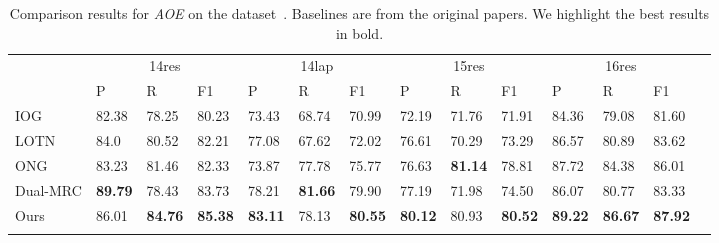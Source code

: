 \documentclass[11pt,a4paper]{article}
\begin{document}
\begin{table*}[ht]
  \centering\small
  \setlength{\tabcolsep}{0.75pt} \renewcommand{\arraystretch}{1.3}
  \begin{tabular}{m{2.5cm}m{1.065cm}<{\centering}m{1.065cm}<{\centering}m{1.065cm}<{\centering}|m{1.065cm}<{\centering}m{1.065cm}<{\centering}m{1.065cm}<{\centering}|m{1.065cm}<{\centering}m{1.065cm}<{\centering}m{1.065cm}<{\centering}|m{1.065cm}<{\centering}m{1.065cm}<{\centering}m{1.065cm}<{\centering}m{1.065cm}<{\centering}}
    \Xhline{0.08em}
    \multirow{2}{*}{Model} & \multicolumn{3}{c|}{14res} & \multicolumn{3}{c|}{14lap} & \multicolumn{3}{c|}{15res} & \multicolumn{3}{c}{16res} \\
    \cline{2-13}
    & P       & R      & F1     & P       & R      & F1     & P       & R      & F1     & P       & R      & F1     \\
    \cline{1-13}
    IOG                    & 82.38   & 78.25  & 80.23  & 73.43   & 68.74  & 70.99  & 72.19   & 71.76  & 71.91  & 84.36   & 79.08  & 81.60   \\
  LOTN                   & 84.0      & 80.52  & 82.21  & 77.08   & 67.62  & 72.02  & 76.61   & 70.29  & 73.29  & 86.57   & 80.89  & 83.62  \\
  ONG                    & 83.23   & 81.46  & 82.33  & 73.87   & 77.78  & 75.77  & 76.63   & \textbf{81.14}  & 78.81  & 87.72   & 84.38  & 86.01  \\
  Dual-MRC               & \textbf{89.79}   & 78.43  & 83.73  & 78.21   & \textbf{81.66}  & 79.90   & 77.19   & 71.98  & 74.50   & 86.07   & 80.77  & 83.33  \\
    \Xhline{0.05em}
    Ours                   & 86.01    & \textbf{84.76}  & \textbf{85.38}  & \textbf{83.11}   & 78.13  & \textbf{80.55}  & \textbf{80.12}   & 80.93  & \textbf{80.52}  & \textbf{89.22}   & \textbf{86.67}   & \textbf{87.92}  \\
  \Xhline{0.08em}
  \end{tabular}
  \caption{Comparison results for \emph{AOE}  on the   dataset~\citep{DBLP:conf/naacl/FanWDHC19}. Baselines are from  the original papers. We highlight the best results in bold.}
  \label{tb:fan}
  \end{table*}
\end{document}

